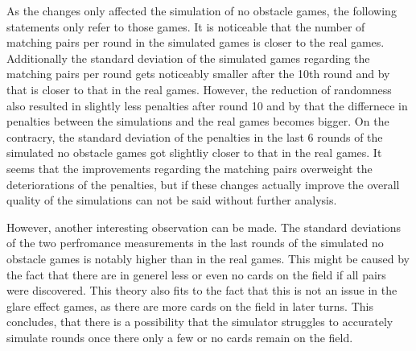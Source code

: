 As the changes only affected the simulation of no obstacle games, the following statements only refer to those games. It is noticeable that the number of matching pairs per round in the simulated games is closer to the real games. Additionally the standard deviation of the simulated games regarding the matching pairs per round gets noticeably smaller after the 10th round and by that is closer to that in the real games. However, the reduction of randomness also resulted in slightly less penalties after round 10 and by that the differnece in penalties between the simulations and the real games becomes bigger. On the contracry, the standard deviation of the penalties in the last 6 rounds of the simulated no obstacle games got slightliy closer to that in the real games. It seems that the improvements regarding the matching pairs overweight the deteriorations of the penalties, but if these changes actually improve the overall quality of the simulations can not be said without further analysis. 

However, another interesting observation can be made. The standard deviations of the two perfromance measurements in the last rounds of the simulated no obstacle games is notably higher than in the real games. This might be caused by the fact that there are in generel less or even no cards on the field if all pairs were discovered. This theory also fits to the fact that this is not an issue in the glare effect games, as there are more cards on the field in later turns. This concludes, that there is a possibility that the simulator struggles to accurately simulate rounds once there only a few or no cards remain on the field. 

